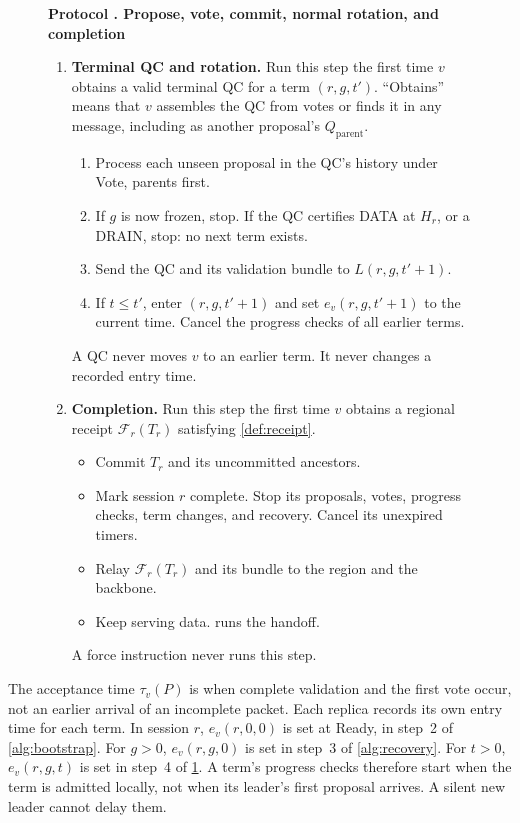 \documentclass[11pt,a4paper]{article}
\newcommand{\RR}[1]{{\color{rrRed}#1}}
\newcommand{\FC}{\mathcal F}
\newcounter{protocol}
\newenvironment{protocol}[2]{\begin{figure}[htbp]\refstepcounter{protocol}\label{#1}
\begin{mdframed}[linewidth=.6pt,skipabove=0pt,skipbelow=0pt,
innertopmargin=7pt,innerbottommargin=7pt]\small
\textbf{Protocol \theprotocol. #2}\par\smallskip}{\end{mdframed}\end{figure}}
\begin{document}
\begin{protocol}{alg:steady}{Propose, vote, commit, normal rotation\RR{, and completion}}
\begin{enumerate}[label=\textbf{\arabic*)},itemsep=3pt]
\item \textbf{Terminal QC and rotation.} Run this step the first time
$v$ obtains a valid terminal QC for a term $(r,g,t')$.
``Obtains'' means that $v$ assembles the QC from votes or finds it in
any message, including as another proposal's $Q_{\mathrm{parent}}$.
 \begin{enumerate}[label=(\alph*)]
 \item Process each unseen proposal in the QC's history under Vote,
       parents first.
 \item If $g$ is now frozen, stop. \RR{If the QC certifies DATA at
       $H_r$, or a DRAIN, stop: no next term exists.}
 \item Send the QC and its validation bundle to $L(r,g,t'+1)$.
 \item If $t\le t'$, enter $(r,g,t'+1)$ and set $e_v(r,g,t'+1)$ to the
       current time. Cancel the progress checks of all earlier
       terms.
 \end{enumerate}
 A QC never moves $v$ to an earlier term. It never changes a recorded
 entry time.

\item \RR{\textbf{Completion.} Run this step the first time $v$ obtains a
regional receipt $\FC_r(T_r)$ satisfying \cref{def:receipt}.}
 \begin{itemize}\color{rrRed}
 \item Commit $T_r$ and its uncommitted ancestors.
 \item Mark session $r$ complete. Stop its proposals, votes, progress
       checks, term changes, and recovery. Cancel its unexpired timers.
 \item Relay $\FC_r(T_r)$ and its bundle to the region and the backbone.
 \item Keep serving data.  runs the handoff.
 \end{itemize}
 \RR{A force instruction never runs this step.}
\end{enumerate}
\end{protocol}

The acceptance time $\tau_v(P)$ is when complete validation and the first
vote occur, not an earlier arrival of an incomplete packet. Each replica
records its own entry time for each term. In session $r$, $e_v(r,0,0)$ is
set at Ready, in step~2 of \cref{alg:bootstrap}. For $g>0$, $e_v(r,g,0)$ is
set in step~3 of \cref{alg:recovery}. For $t>0$, $e_v(r,g,t)$ is set in
step~4 of \cref{alg:steady}. A term's progress checks therefore start
when the term is admitted locally, not when its leader's first proposal
arrives. A silent new leader cannot delay them.
\end{document}
